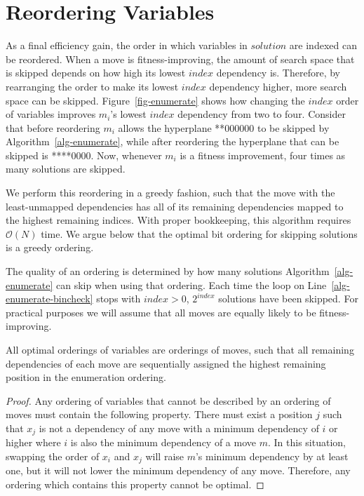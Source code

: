 \documentclass[runningheads,a4paper]{llncs}
\newcommand{\BigO}[1]{$\mathcal{O}{(#1)}$}
\begin{document}
\section{Reordering Variables}
\label{sec-reorder}
As a final efficiency gain, the order in which variables in $solution$ are indexed can be reordered.
When a move is fitness-improving,
the amount of search space that is skipped depends on how high its lowest $index$ dependency is. Therefore,
by rearranging the order to make its lowest $index$ dependency higher, more search space can be skipped. 
Figure~\ref{fig-enumerate} shows how changing the $index$ order of variables
improves $m_i$'s lowest $index$ dependency from two to four. Consider that before reordering $m_i$ allows the hyperplane
**000000 to be skipped by Algorithm~\ref{alg-enumerate}, while after reordering the hyperplane that can be skipped is ****0000.
Now, whenever $m_i$ is a fitness improvement, four times as many solutions are skipped.

We perform this reordering in a greedy fashion, such that the move with the
least-unmapped dependencies has all of its remaining dependencies mapped to the
highest remaining indices. With proper bookkeeping, this algorithm requires
\BigO{N} time. We argue below that the optimal bit ordering for skipping solutions
is a greedy ordering.

The quality of an ordering is determined by how many solutions
Algorithm~\ref{alg-enumerate} can skip when using that ordering.
Each time the loop on Line~\ref{alg-enumerate-bincheck} stops with $index>0$,
$2^{index}$ solutions have been skipped. For practical purposes we will
assume that all moves are equally likely to be fitness-improving.

\begin{lemma}
All optimal orderings of variables are orderings of moves, such that
all remaining dependencies of each move are sequentially assigned the
highest remaining position in the enumeration ordering.
\end{lemma}

\begin{proof}
Any ordering of variables that cannot be described by an ordering of moves
must contain the following property. There must exist a position $j$
such that $x_j$ is not a dependency of any move with
a minimum dependency of $i$ or higher where $i$ is also the minimum dependency of a move $m$.
In this situation, swapping the order of $x_i$ and $x_j$ will raise $m$'s
minimum dependency by at least one, but it will not lower the minimum dependency of any
move. Therefore, any ordering which contains this property cannot be optimal.
\end{proof}
\end{document}
